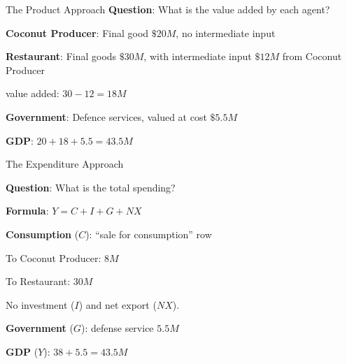 \documentclass[11pt,aspectratio=169,usenames,dvipsnames]{beamer}
\let\tempone\itemize
\let\temptwo\enditemize
\renewenvironment{itemize}{\tempone\addtolength{\itemsep}{\fill}}{\temptwo}
\begin{document}
\begin{frame}{The Product Approach}
\label{slide:The_Product_Approach}
\textbf{Question}: \alert{What is the value added by each agent?}

\begin{itemize}
    \item \textbf{Coconut Producer}: Final good $ \$20M $, no intermediate input
    \item \textbf{Restaurant}: Final goods $ \$30M $, with intermediate input $ \$12M $ from Coconut Producer
    \begin{itemize}
        \item value added: $ 30 - 12 = 18M $
    \end{itemize}
    \item \textbf{Government}: Defence services, valued at cost $ \$5.5M $
    \item \textbf{GDP}: $ 20 + 18 + 5.5 = 43.5M $
\end{itemize}
\end{frame}

\begin{frame}{The Expenditure Approach}
\label{slide:The_Expenditure_Approach}

\textbf{Question}: \alert{What is the total spending?}

\begin{itemize}
    \item \textbf{Formula}: $ Y = C + I + G + NX $
    \item \textbf{Consumption} ($C$): ``sale for consumption'' row
    \begin{itemize}
        \item To Coconut Producer: $ 8M $
        \item To Restaurant: $ 30M $
    \end{itemize}
    \item No investment ($ I $) and net export ($ NX $).
    \item \textbf{Government} ($G$): defense service $ 5.5M $
    \item \textbf{GDP} ($Y$): $ 38 + 5.5 = 43.5M $
\end{itemize}
\end{frame}
\end{document}
